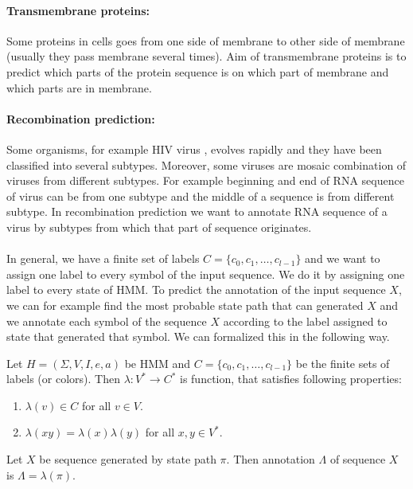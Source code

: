 \paragraph{Transmembrane proteins:} Some proteins in cells goes from one side of
membrane to other side of membrane (usually they pass membrane several times).
Aim of transmembrane proteins is to predict which parts of the protein sequence
is on which part of membrane and which parts are in membrane.

\paragraph{Recombination prediction:} Some organisms, for example HIV virus
, evolves rapidly and they have been classified into several subtypes.
Moreover, some viruses are mosaic combination of viruses from different
subtypes. For example beginning and end of RNA sequence of virus can be from 
one subtype and the middle of a sequence is from different subtype. In
recombination prediction we want to annotate RNA sequence of a virus by subtypes
from which that part of sequence originates.
\paragraph{}
In general, we have a finite set of labels $C=\{c_0,c_1,\dots,c_{l-1}\}$ and we
want to assign one label to every symbol of the input sequence. We do it by
assigning one label to every state of HMM.
To predict the annotation of the input sequence $X$, we can for example find the
most probable state path that can generated $X$ and we annotate each symbol of
the sequence $X$ according to the label assigned to state that generated that
symbol. We can formalized this in the following way.


\begin{definition}
Let $H=(\Sigma,V,I,e,a)$ be HMM and $C=\{c_0,c_1,\dots,c_{l-1}\}$ be the finite
sets of labels (or colors). Then  
$\lambda: V^*\to C^*$ is function, that satisfies following properties:
\begin{enumerate}
\item $\lambda(v)\in C$ for all $v\in V$.
\item $\lambda(xy) = \lambda(x)\lambda(y)$ for all $x,y\in V^*$.
\end{enumerate}

Let $X$ be sequence generated by state path $\pi$. Then annotation
$\Lambda$ of sequence $X$ is $\Lambda = \lambda(\pi)$.
\end{definition}


